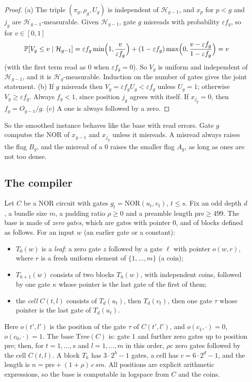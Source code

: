 \documentclass[11pt]{amsart}
\theoremstyle{definition}
\theoremstyle{remark}
\newcommand{\eps}{\varepsilon}
\newcommand{\NOR}{\mathrm{NOR}}
\newcommand{\PP}{\mathbb{P}}
\begin{document}
\begin{proof}
(a) The triple $(\pi_g,\rho_g,U_g)$ is independent of $\mathcal H_{g-1}$, and $x_p$ for $p<g$ and
$j_g$ are $\mathcal H_{g-1}$-measurable. Given $\mathcal H_{g-1}$, gate $g$ misreads with
probability $\eps f_g$, so for $v\in[0,1]$
\[
\PP[V_g\le v\mid\mathcal H_{g-1}]=\eps f_g\min\Bigl(1,\frac{v}{\eps f_g}\Bigr)+(1-\eps f_g)\max\Bigl(0,\frac{v-\eps f_g}{1-\eps f_g}\Bigr)=v
\]
(with the first term read as $0$ when $\eps f_g=0$). So $V_g$ is uniform and independent of
$\mathcal H_{g-1}$, and it is $\mathcal H_g$-measurable. Induction on the number of gates gives the
joint statement.
(b) If $g$ misreads then $V_g=\eps f_gU_g<\eps f_g$ unless $U_g=1$; otherwise $V_g\ge\eps f_g$.
Always $f_g<1$, since position $j_g$ agrees with itself. If $x_{j_g}=0$, then $f_g=O_{g-1}/g$.
(c) A one is always followed by a zero.
\end{proof}

So the smoothed instance behaves like the base with read errors. Gate $g$ computes the NOR of
$x_{g-1}$ and $x_{j_g}$ unless it misreads. A misread always raises the flag $B_g$, and the misread
of a $0$ raises the smaller flag $A_g$, as long as ones are not too dense.

\subsection{The compiler}

Let $C$ be a NOR circuit with gates $g_t=\NOR(u_t,v_t)$, $t\le s$. Fix an odd depth $d$, a bundle
size $m$, a padding ratio $\rho\ge0$ and a preamble length $\mathrm{pre}\ge499$. The base is made
of \emph{zero gates}, which are gates with pointer $0$, and of blocks defined as follows. For an
input $w$ (an earlier gate or a constant):
\begin{itemize}[leftmargin=2em]
\item $T_0(w)$ is a \emph{leaf}: a zero gate $z$ followed by a gate $\ell$ with pointer $o(w,r)$,
where $r$ is a fresh uniform element of $\{1,\dots,m\}$ (a coin);
\item $T_{h+1}(w)$ consists of two blocks $T_h(w)$, with independent coins, followed by one gate
$\kappa$ whose pointer is the last gate of the first of them;
\item the \emph{cell} $C(t,l)$ consists of $T_d(u_t)$, then $T_d(v_t)$, then one gate $\tau$ whose
pointer is the last gate of $T_d(u_t)$.
\end{itemize}
Here $o(t',l')$ is the position of the gate $\tau$ of $C(t',l')$, and $o(c_1,\cdot)=0$,
$o(c_0,\cdot)=1$. The base $\mathrm{Tree}(C)$ is: gate $1$ and further zero gates up to position
$\mathrm{pre}$; then, for $t=1,\dots,s$ and $l=1,\dots,m$ in this order, $\rho c$ zero gates
followed by the cell $C(t,l)$. A block $T_h$ has $3\cdot2^h-1$ gates, a cell has $c=6\cdot2^d-1$,
and the length is $n=\mathrm{pre}+(1+\rho)\,c\,sm$. All positions are explicit arithmetic
expressions, so the base is computable in logspace from $C$ and the coins.
\end{document}
